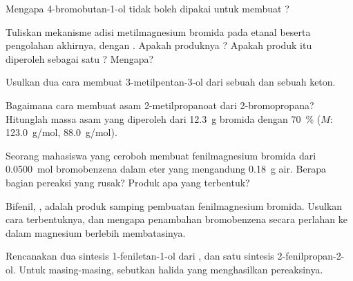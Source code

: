\begin{exercise}[$\star$]\label{exo:b1:organomagnesium:4}
Mengapa 4-bromobutan-1-ol tidak boleh dipakai untuk membuat ?
\end{exercise}

\begin{exercise}[$\star\star$]\label{exo:b1:organomagnesium:5}
Tuliskan mekanisme adisi metilmagnesium bromida pada etanal beserta
pengolahan akhirnya, dengan . Apakah produknya ?
Apakah produk itu diperoleh sebagai satu ? Mengapa?
\end{exercise}

\begin{exercise}[$\star\star$]\label{exo:b1:organomagnesium:6}
Usulkan dua cara membuat 3-metilpentan-3-ol dari sebuah 
dan sebuah keton.
\end{exercise}

\begin{exercise}[$\star\star$]\label{exo:b1:organomagnesium:7}
Bagaimana cara membuat asam 2-metilpropanoat dari 2-bromopropana?
Hitunglah massa asam yang diperoleh dari \qty{12.3}{g} bromida dengan
 \qty{70}{\percent} ($M$:  \qty{123.0}{g/mol},
 \qty{88.0}{g/mol}).
\end{exercise}

\begin{exercise}[$\star\star$]\label{exo:b1:organomagnesium:8}
Seorang mahasiswa yang ceroboh membuat fenilmagnesium bromida dari
\qty{0.0500}{mol} bromobenzena dalam eter yang mengandung \qty{0.18}{g}
air. Berapa bagian pereaksi yang rusak? Produk apa yang terbentuk?
\end{exercise}

\begin{exercise}[$\star\star$]\label{exo:b1:organomagnesium:9}
Bifenil, , adalah produk samping pembuatan fenilmagnesium
bromida. Usulkan cara terbentuknya, dan mengapa penambahan bromobenzena
secara perlahan ke dalam magnesium berlebih membatasinya.
\end{exercise}

\begin{exercise}[$\star\star\star$]\label{exo:b1:organomagnesium:10}
Rencanakan dua sintesis 1-feniletan-1-ol dari , dan satu
sintesis 2-fenilpropan-2-ol. Untuk masing-masing, sebutkan halida yang
menghasilkan pereaksinya.
\end{exercise}

